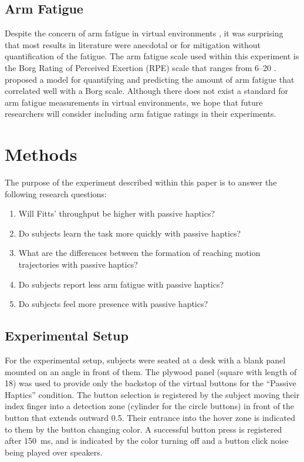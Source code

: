 \subsection{Arm Fatigue}

Despite the concern of arm fatigue in virtual environments \citep{burdea_virtual_2003}, it was surprising that most results in literature were anecdotal or for mitigation without quantification of the fatigue.
The arm fatigue scale used within this experiment is the Borg Rating of Perceived Exertion (RPE) scale that ranges from \numrange{6}{20} \citep{borg_borgs_1998}.
\citet{hincapie-ramos_consumed_2014} proposed a model for quantifying and predicting the amount of arm fatigue that correlated well with a Borg scale.
Although there does not exist a standard for arm fatigue measurements in virtual environments, we hope that future researchers will consider including arm fatigue ratings in their experiments.

\section{Methods}

The purpose of the experiment described within this paper is to answer the following research questions:

\begin{enumerate}
    \item Will Fitts' throughput be higher with passive haptics?
    \item Do subjects learn the task more quickly with passive haptics?
    \item What are the differences between the formation of reaching motion trajectories with passive haptics?
    \item Do subjects report less arm fatigue with passive haptics?
    \item Do subjects feel more presence with passive haptics?
\end{enumerate}

\subsection{Experimental Setup}

For the experimental setup, subjects were seated at a desk with a blank panel mounted on an angle in front of them.
The plywood panel (square with length of \SI{18}{\inch}) was used to provide only the backstop of the virtual buttons for the ``Passive Haptics'' condition.
The button selection is registered by the subject moving their index finger into a detection zone (cylinder for the circle buttons) in front of the button that extends outward \SI{0.5}{\inch}.
Their entrance into the hover zone is indicated to them by the button changing color.
A successful button press is registered after \SI{150}{\milli\second}, and is indicated by the color turning off and a button click noise being played over speakers.

